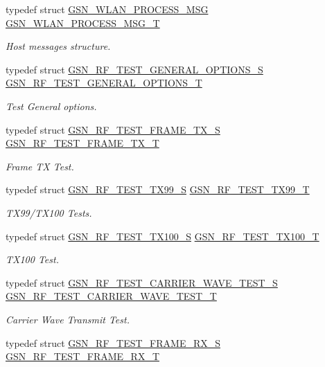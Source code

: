 \begin{DoxyCompactItemize}
typedef struct \hyperlink{a00418}{GSN\_\-WLAN\_\-PROCESS\_\-MSG} \hyperlink{a00677_gaabf8bae549f7aca1d1a07fbc8f2d4459}{GSN\_\-WLAN\_\-PROCESS\_\-MSG\_\-T}
\begin{DoxyCompactList}\small\item\em Host messages structure. \end{DoxyCompactList}\item 
typedef struct \hyperlink{a00188}{GSN\_\-RF\_\-TEST\_\-GENERAL\_\-OPTIONS\_\-S} \hyperlink{a00677_gadc69ae2ca627931231f38c5a07778b9a}{GSN\_\-RF\_\-TEST\_\-GENERAL\_\-OPTIONS\_\-T}
\begin{DoxyCompactList}\small\item\em Test General options. \end{DoxyCompactList}\item 
typedef struct \hyperlink{a00187}{GSN\_\-RF\_\-TEST\_\-FRAME\_\-TX\_\-S} \hyperlink{a00677_ga054447e13e32b5fdf1ba941142c3b8b8}{GSN\_\-RF\_\-TEST\_\-FRAME\_\-TX\_\-T}
\begin{DoxyCompactList}\small\item\em Frame TX Test. \end{DoxyCompactList}\item 
typedef struct \hyperlink{a00190}{GSN\_\-RF\_\-TEST\_\-TX99\_\-S} \hyperlink{a00677_gad6f744cc56ee1d2eefa8b1b733cacbe5}{GSN\_\-RF\_\-TEST\_\-TX99\_\-T}
\begin{DoxyCompactList}\small\item\em TX99/TX100 Tests. \end{DoxyCompactList}\item 
typedef struct \hyperlink{a00189}{GSN\_\-RF\_\-TEST\_\-TX100\_\-S} \hyperlink{a00677_ga69f7ed019cbe7d83cfe2cc5446cdab1a}{GSN\_\-RF\_\-TEST\_\-TX100\_\-T}
\begin{DoxyCompactList}\small\item\em TX100 Test. \end{DoxyCompactList}\item 
typedef struct \hyperlink{a00185}{GSN\_\-RF\_\-TEST\_\-CARRIER\_\-WAVE\_\-TEST\_\-S} \hyperlink{a00677_gae9bb588f7933f628f82d3351844e18f8}{GSN\_\-RF\_\-TEST\_\-CARRIER\_\-WAVE\_\-TEST\_\-T}
\begin{DoxyCompactList}\small\item\em Carrier Wave Transmit Test. \end{DoxyCompactList}\item 
typedef struct \hyperlink{a00186}{GSN\_\-RF\_\-TEST\_\-FRAME\_\-RX\_\-S} \hyperlink{a00677_gad57c6b5251e62dd07e194a52c90216ac}{GSN\_\-RF\_\-TEST\_\-FRAME\_\-RX\_\-T}

\end{DoxyCompactItemize}
